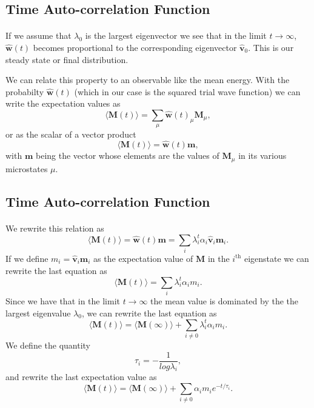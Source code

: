 \subsection*{Time Auto-correlation Function}

\paragraph{}
If we assume that $\lambda_0$ is the largest eigenvector we see that in the limit $t\rightarrow \infty$,
$\mathbf{\hat{w}}(t)$ becomes proportional to the corresponding eigenvector 
$\mathbf{\hat{v}}_0$. This is our steady state or final distribution. 

We can relate this property to an observable like the mean energy.
With the probabilty $\mathbf{\hat{w}}(t)$ (which in our case is the squared trial wave function) we
can write the expectation values as 
\[
 \langle \mathbf{M}(t) \rangle  = \sum_{\mu} \mathbf{\hat{w}}(t)_{\mu}\mathbf{M}_{\mu},
\] 
or as the scalar of a  vector product
 \[
 \langle \mathbf{M}(t) \rangle  = \mathbf{\hat{w}}(t)\mathbf{m},
\] 
with $\mathbf{m}$ being the vector whose elements are the values of $\mathbf{M}_{\mu}$ in its 
various microstates $\mu$.



\subsection*{Time Auto-correlation Function}


\paragraph{}

We rewrite this relation  as
 \[
 \langle \mathbf{M}(t) \rangle  = \mathbf{\hat{w}}(t)\mathbf{m}=\sum_i\lambda_i^t\alpha_i\mathbf{\hat{v}}_i\mathbf{m}_i.
\] 
If we define $m_i=\mathbf{\hat{v}}_i\mathbf{m}_i$ as the expectation value of
$\mathbf{M}$ in the $i^{\mathrm{th}}$ eigenstate we can rewrite the last equation as
 \[
 \langle \mathbf{M}(t) \rangle  = \sum_i\lambda_i^t\alpha_im_i.
\] 
Since we have that in the limit $t\rightarrow \infty$ the mean value is dominated by the 
the largest eigenvalue $\lambda_0$, we can rewrite the last equation as
 \[
 \langle \mathbf{M}(t) \rangle  = \langle \mathbf{M}(\infty) \rangle+\sum_{i\ne 0}\lambda_i^t\alpha_im_i.
\] 
We define the quantity
\[
   \tau_i=-\frac{1}{log\lambda_i},
\]
and rewrite the last expectation value as
 \[
 \langle \mathbf{M}(t) \rangle  = \langle \mathbf{M}(\infty) \rangle+\sum_{i\ne 0}\alpha_im_ie^{-t/\tau_i}.
\label{eq:finalmeanm}
\]



